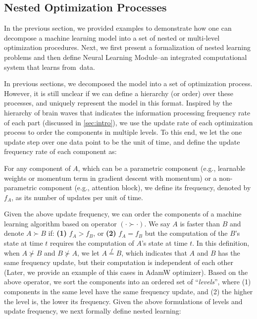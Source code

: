 \subsection{Nested Optimization Processes}\label{sec:nop}
In the previous section, we provided examples to demonstrate how one can decompose a machine learning model into a set of nested or multi-level optimization procedures. Next, we first  present a formalization of nested learning problems and then define Neural Learning Module–an integrated computational system that learns from~data.    

In previous sections,  we decomposed the model into a set of optimization process. However, it is still unclear if we can define a hierarchy (or order) over these processes, and {uniquely represent the model in this format.} Inspired by the hierarchy of brain waves that indicates the information processing frequency rate of each part (discussed in \autoref{sec:intro}), we use the update rate of each optimization process to order the components in multiple levels. To this end, we let the one update step over one data point to be the unit of time, and define the update frequency rate of each component as: 
\begin{dfn}\label{dfn:uf}
    For any component of $A$, which can be a parametric component (e.g., learnable weights or momentum term in gradient descent with momentum) or a non-parametric component (e.g., attention block), we define its frequency, denoted by $f_A$, as its number of updates per unit of time.   
\end{dfn}
Given the above update frequency, we can order the components of a machine learning algorithm based on operator $(\cdot \succ \cdot)$. We say $A$ is faster than $B$ and denote $A \succ B$ if: \textbf{(1)}  $f_A > f_B$, or \textbf{(2)} $f_A = f_B$ but the computation of the $B$'s state at time $t$ requires the computation of $A$'s state at time $t$. In this definition, when $A \nsucc B$ and $B \nsucc A$, we let $A \overset{f}{=} B$, which indicates that $A$ and $B$ has the same frequency update, but their computation is independent of each other (Later, we provide an example of this cases in AdamW optimizer).  Based on the above operator, we sort the components into an ordered set of ``\emph{levels}'', where (1) components in the same level have the same frequency update, and (2) the higher the level is, the lower its frequency. Given the above formulations of levels and update frequency, we next formally define nested learning:

